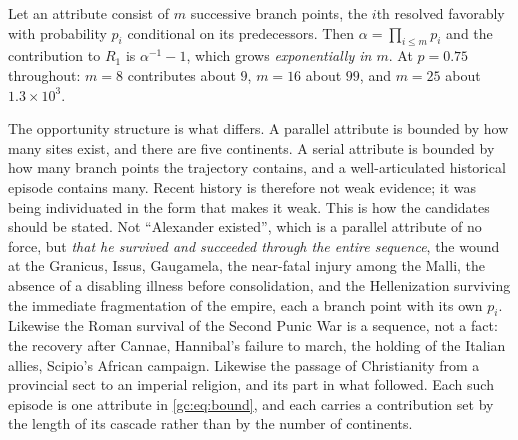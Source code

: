 \begin{proposition}
\label{gc:prop:cascade}
Let an attribute consist of $m$ successive branch points, the $i$th
resolved favorably with probability $p_i$ conditional on its
predecessors. Then $\alpha=\prod_{i\le m}p_i$ and the contribution to
$R_1$ is $\alpha^{-1}-1$, which grows \emph{exponentially in $m$}. At
$p=0.75$ throughout: $m=8$ contributes about $9$, $m=16$ about $99$,
and $m=25$ about $1.3\times10^{3}$.
\end{proposition}

\noindent The opportunity structure is what differs. A parallel
attribute is bounded by how many sites exist, and there are five
continents. A serial attribute is bounded by how many branch points the
trajectory contains, and a well-articulated historical episode contains
many. Recent history is therefore not weak evidence; it was being
individuated in the form that makes it weak. This is how the candidates should be stated. Not ``Alexander existed'',
which is a parallel attribute of no force, but \emph{that he survived
and succeeded through the entire sequence}, the wound at the
Granicus, Issus, Gaugamela, the near-fatal injury among the Malli, the
absence of a disabling illness before consolidation, and the
Hellenization surviving the immediate fragmentation of the empire, each a branch point with its own $p_i$. Likewise the Roman survival of
the Second Punic War is a sequence, not a fact: the recovery after
Cannae, Hannibal's failure to march, the holding of the Italian allies,
Scipio's African campaign. Likewise the passage of Christianity from a
provincial sect to an imperial religion, and its part in what followed.
Each such episode is one attribute in \eqref{gc:eq:bound}, and each
carries a contribution set by the length of its cascade rather than by
the number of continents.

